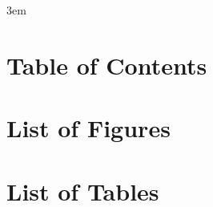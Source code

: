 \documentclass[10pt,twoside]{book}
\begin{document}
\emergencystretch 3em

\frontmatter



% 

% 

\chapter{Table of Contents}
\tableofcontents %
\clearpage

\chapter{List of Figures}
\listoffigures
\clearpage

\chapter{List of Tables}
\listoftables
\clearpage

% 

\mainmatter

% 

% 

% 
\end{document}
